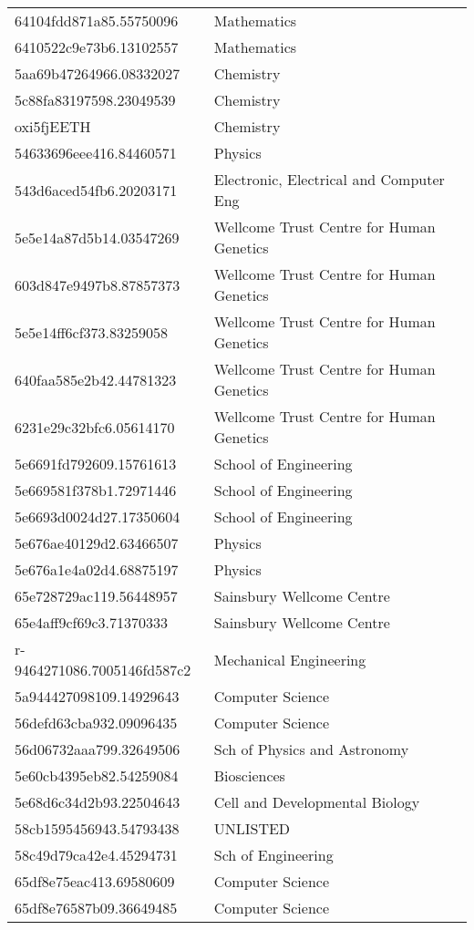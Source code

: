 \begin{tabular}{ll}
64104fdd871a85.55750096 & Mathematics \\
6410522c9e73b6.13102557 & Mathematics \\
5aa69b47264966.08332027 & Chemistry \\
5c88fa83197598.23049539 & Chemistry \\
oxi5fjEETH & Chemistry \\
54633696eee416.84460571 & Physics \\
543d6aced54fb6.20203171 & Electronic, Electrical and Computer Eng \\
5e5e14a87d5b14.03547269 & Wellcome Trust Centre for Human Genetics \\
603d847e9497b8.87857373 & Wellcome Trust Centre for Human Genetics \\
5e5e14ff6cf373.83259058 & Wellcome Trust Centre for Human Genetics \\
640faa585e2b42.44781323 & Wellcome Trust Centre for Human Genetics \\
6231e29c32bfc6.05614170 & Wellcome Trust Centre for Human Genetics \\
5e6691fd792609.15761613 & School of Engineering \\
5e669581f378b1.72971446 & School of Engineering \\
5e6693d0024d27.17350604 & School of Engineering \\
5e676ae40129d2.63466507 & Physics \\
5e676a1e4a02d4.68875197 & Physics \\
65e728729ac119.56448957 & Sainsbury Wellcome Centre \\
65e4aff9cf69c3.71370333 & Sainsbury Wellcome Centre \\
r-9464271086.7005146fd587c2 & Mechanical Engineering \\
5a944427098109.14929643 & Computer Science \\
56defd63cba932.09096435 & Computer Science \\
56d06732aaa799.32649506 & Sch of Physics and Astronomy \\
5e60cb4395eb82.54259084 & Biosciences \\
5e68d6c34d2b93.22504643 & Cell and Developmental Biology \\
58cb1595456943.54793438 & UNLISTED \\
58c49d79ca42e4.45294731 & Sch of Engineering \\
65df8e75eac413.69580609 & Computer Science \\
65df8e76587b09.36649485 & Computer Science \\

\end{tabular}
